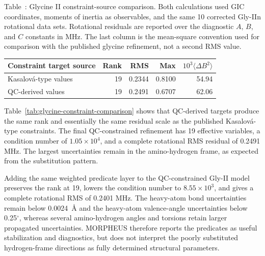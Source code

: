 \documentclass[aip,jcp,reprint,longbibliography,floatfix]{revtex4-2}
\begin{document}
\begin{center}
\label{tab:glycine-constraint-comparison}
\parbox{0.94\linewidth}{\small\raggedright Table~\thetable: Glycine II
constraint-source comparison. Both calculations used GIC coordinates, moments
of inertia as observables, and the same 10 corrected Gly-IIn rotational data
sets. Rotational residuals are reported over the diagnostic $A$, $B$, and $C$
constants in MHz. The last column is the mean-square convention used for
comparison with the published glycine refinement, not a second RMS value.\par}
\smallskip
\small
\begin{tabular}{lrrrr}
\toprule
Constraint target source & Rank & RMS & Max & $10^3\langle\Delta B^2\rangle$ \\
\midrule
Kasalov{\'a}-type values & 19 & 0.2344 & 0.8100 & 54.94 \\
QC-derived values & 19 & 0.2491 & 0.6707 & 62.06 \\
\bottomrule
\end{tabular}
\end{center}

Table~\ref{tab:glycine-constraint-comparison} shows that QC-derived targets
produce the same rank and essentially the same residual scale as the published
Kasalov{\'a}-type constraints. The final QC-constrained refinement has 19
effective variables, a condition number of $1.05\times10^4$, and a complete
rotational RMS residual of 0.2491 MHz. The largest uncertainties remain in the
amino-hydrogen frame, as expected from the substitution pattern.

Adding the same weighted predicate layer to the QC-constrained Gly-II model
preserves the rank at 19, lowers the condition number to $8.55\times10^3$, and
gives a complete rotational RMS of 0.2401 MHz. The heavy-atom bond
uncertainties remain below 0.0024~\AA{} and the heavy-atom valence-angle
uncertainties below 0.25$^\circ$, whereas several amino-hydrogen angles and
torsions retain larger propagated uncertainties. MORPHEUS therefore reports
the predicates as useful stabilization and diagnostics, but does not interpret
the poorly substituted hydrogen-frame directions as fully determined structural
parameters.
\end{document}
